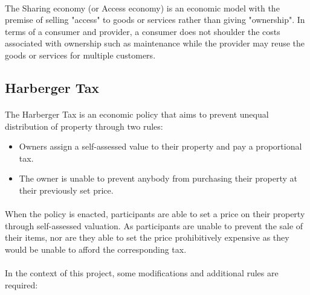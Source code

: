 \paragraph{} The Sharing economy (or Access economy) is an economic model with the premise of selling "access" to goods or services rather than giving "ownership". In terms of a consumer and provider, a consumer does not shoulder the costs associated with ownership such as maintenance while the provider may reuse the goods or services for multiple customers. 

\subsection{Harberger Tax} \label{section:harbergerstax}


\paragraph{} The Harberger Tax is an economic policy that aims to prevent unequal distribution of property through two rules:

\begin{itemize}
  \item Owners assign a self-assessed value to their property and pay a proportional tax. 
  \item The owner is unable to prevent anybody from purchasing their property at their previously set price.
\end{itemize}


\paragraph{} When the policy is enacted, participants are able to set a price on their property through self-assessed valuation. As participants are unable to prevent the sale of their items, nor are they able to set the price prohibitively expensive as they would be unable to afford the corresponding tax. 

\paragraph{} In the context of this project, some modifications and additional rules are required:

